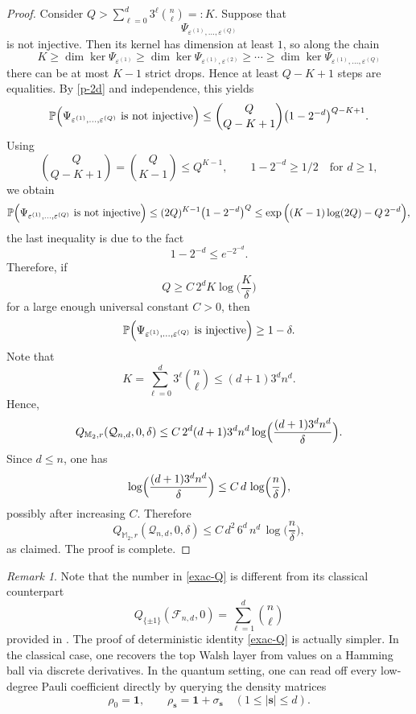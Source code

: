\documentclass{amsbook}
\theoremstyle{definition}
\theoremstyle{remark}
\newtheorem{remark}[theorem]{Remark}
\numberwithin{section}{chapter}
\numberwithin{equation}{chapter}
\newcommand{\M}{\mathbb{M}}
\newcommand{\1}{\mathbf{1}}
\newcommand{\s}{\mathbf{s}}
\begin{document}
\begin{proof}
	
	Consider $Q>\sum_{\ell=0}^d 3^\ell \binom{n}{\ell}=:K$.
	Suppose that
	\[
	\Psi_{\varepsilon^{(1)},\dots,\varepsilon^{(Q)}}
	\]
	is not injective. Then its kernel has dimension at least $1$, so along the chain
	\[
	K\ge \dim\ker \Psi_{\varepsilon^{(1)}}
	\ge
	\dim\ker \Psi_{\varepsilon^{(1)},\varepsilon^{(2)}}
	\ge
	\cdots
	\ge
	\dim\ker \Psi_{\varepsilon^{(1)},\dots,\varepsilon^{(Q)}}
	\]
	there can be at most $K-1$ strict drops. Hence at least $Q-K+1$ steps are equalities.
	By \eqref{p-2d} and independence, this yields
	\[
	\mathbb{P}\Bigl(
	\Psi_{\varepsilon^{(1)},\dots,\varepsilon^{(Q)}}
	\text{ is not injective}
	\Bigr)
	\le
	\binom{Q}{Q-K+1}\bigl(1-2^{-d}\bigr)^{Q-K+1}.
	\]
	Using
	\[
	\binom{Q}{Q-K+1}=\binom{Q}{K-1}\le Q^{K-1},
	\qquad
	1-2^{-d}\ge 1/2 \quad \text{for } d\ge 1,
	\]
	we obtain
	\[
	\mathbb P\Bigl(
	\Psi_{\varepsilon^{(1)},\dots,\varepsilon^{(Q)}}
	\text{ is not injective}
	\Bigr)
	\le
	(2Q)^{K-1}\bigl(1-2^{-d}\bigr)^Q\leq \exp\Big((K-1)\log(2Q)-Q\,2^{-d}\Big),
	\]
	the last inequality is due to the fact
	\[
	1-2^{-d}\le e^{-2^{-d}}.
	\]
	Therefore, if
	\[
	Q\ge C\,2^d K \log \Big(\frac{K}{\delta}\Big)
	\]
	for a large enough universal constant $C>0$, then
	\[
	\mathbb{P}\Bigl(
	\Psi_{\varepsilon^{(1)},\dots,\varepsilon^{(Q)}}
	\text{ is injective}
	\Bigr)\ge 1-\delta.
	\]
Note that
	\[K=
	\sum_{\ell=0}^d 3^\ell \binom n\ell
	\le
	(d+1)3^d n^d.
	\]
	Hence,
	\[
	Q_{\M_2,r}(\mathcal Q_{n,d},0,\delta)
	\le
	C\,2^d(d+1)3^d n^d
	\log \Bigl(\frac{(d+1)3^d n^d}{\delta}\Bigr).
	\]
	Since $d\le n$, one has
	\[
	\log \Bigl(\frac{(d+1)3^d n^d}{\delta}\Bigr)
	\le
	C\,d\,\log \Bigl(\frac{n}{\delta}\Bigr),
	\]
	possibly after increasing $C$.
	Therefore
	\[
	Q_{\M_2,r}(\mathcal Q_{n,d},0,\delta)
	\le
	C\,d^2\,6^d\,n^d\,\log \Big(\frac{n}{\delta}\Big),
	\]
	as claimed. The proof is complete.
\end{proof}




\begin{remark}\label{rho-re}
Note that the number in \eqref{exac-Q} is different from its classical counterpart
$$Q_{\{\pm1\}}(\mathcal{F}_{n,d},0)=\sum_{\ell=1}^d \binom{n}{\ell} $$
 provided in \cite[Theorem 10]{EIS2023}.
 The proof of deterministic identity \eqref{exac-Q} is actually simpler. 
In the classical case, one recovers the top Walsh layer from values on a Hamming ball
	via discrete derivatives. In the quantum setting, one can read off every low-degree Pauli coefficient
	directly by querying the density matrices
	\[
	\rho_0=\mathbf{1},
	\qquad
	\rho_{\s}=\mathbf{1}+\sigma_{\s}\quad (1\leq |\s|\le d).
	\]
\end{remark}
\end{document}

